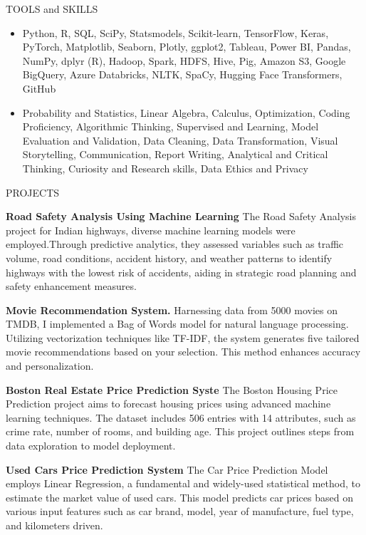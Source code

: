 \documentclass{resume} %
\begin{document}
\begin{rSection}{TOOLS and SKILLS}
\begin{itemize}
    \itemsep -3pt{}
    \item Python, R, SQL, SciPy, Statsmodels, Scikit-learn, TensorFlow, Keras, PyTorch, Matplotlib, Seaborn, Plotly, ggplot2, Tableau, Power BI, Pandas, NumPy, dplyr (R), Hadoop, Spark, HDFS, Hive, Pig, Amazon S3, Google BigQuery, Azure Databricks, NLTK, SpaCy, Hugging Face Transformers, GitHub
    \item Probability and Statistics, Linear Algebra, Calculus, Optimization, Coding Proficiency, Algorithmic Thinking, Supervised and Learning, Model Evaluation and Validation, Data Cleaning, Data Transformation, Visual Storytelling, Communication, Report Writing, Analytical and Critical Thinking, Curiosity and Research skills, Data Ethics and Privacy 
\end{itemize}
\end{rSection}

\begin{rSection}{PROJECTS}
\vspace{-1.25em}
\item \textbf{Road Safety Analysis Using Machine Learning} {The Road Safety Analysis project for Indian highways, diverse machine learning models were employed.Through predictive analytics, they assessed variables such as traffic volume, road conditions, accident history, and weather patterns to identify highways with the lowest risk of accidents, aiding in strategic road planning and safety enhancement measures.}
\item \textbf{Movie Recommendation System.} {Harnessing data from 5000 movies on TMDB, I implemented a Bag of Words model for natural language processing. Utilizing vectorization techniques like TF-IDF, the system generates five tailored movie recommendations based on your selection. This method enhances accuracy and personalization.}
\item \textbf{Boston Real Estate Price Prediction Syste} {The Boston Housing Price Prediction project aims to forecast housing prices using advanced machine learning techniques. The dataset includes 506 entries with 14 attributes, such as crime rate, number of rooms, and building age. This project outlines steps from data exploration to model deployment.}
\item \textbf{Used Cars Price Prediction System} {The Car Price Prediction Model employs Linear Regression, a fundamental and widely-used statistical method, to estimate the market value of used cars. This model predicts car prices based on various input features such as car brand, model, year of manufacture, fuel type, and kilometers driven.}
\end{rSection} 
\end{document}
